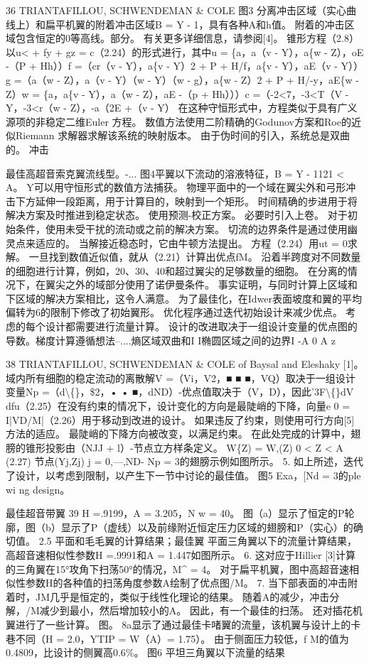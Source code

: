 \documentclass[UTF8,11pt,a4paper,openany,fontset=fandol]{ctexbook}
\begin{document}
36 TRIANTAFILLOU, SCHWENDEMAN \& COLE 图3 分离冲击区域（实心曲线上）和扁平机翼的附着冲击区域B = Y - 1，具有各种A和h值。 附着的冲击区域包含恒定的0等高线。部分。 有关更多详细信息，请参阅[4]。 锥形方程（2.8）以u< + fy + gz = c（2.24）的形式进行，其中u = \{a，a（v - Y），a\{w - Z），oE -（P + Hh））f =（cr（v - Y），a\{v - Y）2 + P + H/f，a\{v - Y），aE（v - Y））g =（a（w - Z），a（v - Y）（w - Y）（w - g），a\{w - Z）2 + P + H/-y，aE\{w - Z）w = \{a，a\{v - Y），a（w - Z），aE -（p + Hh）））c =（-2<7，-3<T（V - Y，-3<r（w - Z），-a（2E +（v - Y） 在这种守恒形式中，方程类似于具有广义源项的非稳定二维Euler 方程。 数值方法使用二阶精确的Godunov方案和Roe的近似Riemann 求解器求解该系统的映射版本。 由于伪时间的引入，系统总是双曲的。 冲击

最佳高超音索克翼流线型。-... 图4平翼以下流动的溶液特征，B = Y - 1121 < A。 Y可以用守恒形式的数值方法捕获。 物理平面中的一个域在翼尖外和弓形冲击下方延伸一段距离，用于计算目的，映射到一个矩形。 时间精确的步进用于将解决方案及时推进到稳定状态。 使用预测-校正方案。 必要时引入上卷。 对于初始条件，使用未受干扰的流动或之前的解决方案。 切流的边界条件是通过使用幽灵点来适应的。 当解接近稳态时，它由牛顿方法提出。 方程（2.24）用ut = 0求解。 一旦找到数值近似值，就从（2.21）计算出优点fM。 沿着半跨度对不同数量的细胞进行计算，例如，20、30、40和超过翼尖的足够数量的细胞。 在分离的情况下，在翼尖之外的域部分使用了诺伊曼条件。 事实证明，与同时计算上区域和下区域的解决方案相比，这令人满意。 为了最佳化，在Idwer表面坡度和翼的平均偏转为6的限制下修改了初始翼形。 优化程序通过迭代初始设计来减少优点。 考虑的每个设计都需要进行流量计算。 设计的改进取决于一组设计变量的优点图的导数。梯度计算遵循想法--....熵区域双曲和I I椭圆区域之间的边界I -A 0 A z

38 TRIANTAFILLOU, SCHWENDEMAN \& COLE of Baysal and Eleshaky [1]。 域内所有细胞的稳定流动的离散解V =（Vi，V2，■ ■ ■，VQ）取决于一组设计变量Np =（d\textbackslash\{\}，\$2，• • ■，dND）-优点值取决于（V，D），因此'3F\textbackslash\{\}dV dfu（2.25）在没有约束的情况下，设计变化的方向是最陡峭的下降，向量e 0 = I|VD/M|（2.26）用于移动到改进的设计。 如果违反了约束，则使用可行方向[5]方法的适应。 最陡峭的下降方向被改变，以满足约束。 在此处完成的计算中，翅膀的锥形投影由（NJJ + l）-节点立方样条定义。 W\{Z) = W,(Z) 0 < Z < A (2.27) 节点(Yj,Zj) j = 0,---,ND- Np = 3的翅膀示例如图所示。 5. 如上所述，迭代了设计，以考虑到限制，以产生下一节中讨论的最佳值。 图5 Exa，[Nd = 3的ple wi ng design。

最佳超音带翼 39 H =.9199，A = 3.205，N w = 40。 图（a）显示了恒定的P轮廓，图（b）显示了P（虚线）以及前缘附近恒定压力区域的翅膀和P（实心）的确切值。 2.5 平面和毛毛翼的计算结果；最佳翼 平面三角翼以下的流量计算结果，高超音速相似性参数H =.9991和A = 1.447如图所示。 6. 这对应于Hillier [3]计算的三角翼在15°攻角下扫荡50°的情况，M\textasciicircum{} = 4。 对于扁平机翼，图中高超音速相似性参数H的各种值的扫荡角度参数A绘制了优点图/M。 7. 当下部表面的冲击附着时，JM几乎是恒定的，类似于线性化理论的结果。 随着A的减少，冲击分解，/M减少到最小，然后增加较小的A。 因此，有一个最佳的扫荡。 还对插花机翼进行了一些计算。 图。 8a显示了通过最佳卡啫翼的流量，该机翼与设计上的卡巷不同（H = 2.0，YTIP = W（A）= 1.75）。 由于侧面压力较低，f M的值为0.4809，比设计的侧翼高0.6\%。 图6 平坦三角翼以下流量的结果
\end{document}
